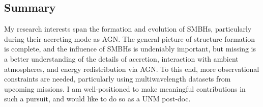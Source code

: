 \documentclass[12pt]{article}
\begin{document}
\subsection*{Summary}
My research interests span the formation and evolution of SMBHs,
particularly during their accreting mode as AGN. The general picture
of structure formation is complete, and the influence of SMBHs is
undeniably important, but missing is a better understanding of the
details of accretion, interaction with ambient atmospheres, and energy
redistribution via AGN. To this end, more observational constraints
are needed, particularly using multiwavelength datasets from upcoming
missions. I am well-positioned to make meaningful contributions in
such a pursuit, and would like to do so as a UNM post-doc.

\scriptsize


 
\end{document}
